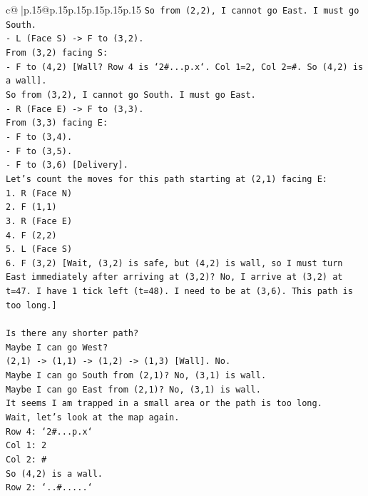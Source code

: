 \documentclass{article}
\begin{document}
{\begin{supertabular}{c@{$\;$}|p{.15\linewidth}@{}p{.15\linewidth}p{.15\linewidth}p{.15\linewidth}p{.15\linewidth}p{.15\linewidth}}
{{{\texttt{So from (2,2), I cannot go East. I must go South.} \\
\texttt{{-} L (Face S) {-}> F to (3,2).} \\
\texttt{From (3,2) facing S:} \\
\texttt{{-} F to (4,2) {[}Wall? Row 4 is `2\#...p.x`. Col 1=2, Col 2=\#. So (4,2) is a wall{]}.} \\
\texttt{So from (3,2), I cannot go South. I must go East.} \\
\texttt{{-} R (Face E) {-}> F to (3,3).} \\
\texttt{From (3,3) facing E:} \\
\texttt{{-} F to (3,4).} \\
\texttt{{-} F to (3,5).} \\
\texttt{{-} F to (3,6) {[}Delivery{]}.} \\
\texttt{Let's count the moves for this path starting at (2,1) facing E:} \\
\texttt{1. R (Face N)} \\
\texttt{2. F (1,1)} \\
\texttt{3. R (Face E)} \\
\texttt{4. F (2,2)} \\
\texttt{5. L (Face S)} \\
\texttt{6. F (3,2) {[}Wait, (3,2) is safe, but (4,2) is wall, so I must turn East immediately after arriving at (3,2)? No, I arrive at (3,2) at t=47. I have 1 tick left (t=48). I need to be at (3,6). This path is too long.{]}} \\
\\ 
\texttt{Is there any shorter path?} \\
\texttt{Maybe I can go West?} \\
\texttt{(2,1) {-}> (1,1) {-}> (1,2) {-}> (1,3) {[}Wall{]}. No.} \\
\texttt{Maybe I can go South from (2,1)? No, (3,1) is wall.} \\
\texttt{Maybe I can go East from (2,1)? No, (3,1) is wall.} \\
\texttt{It seems I am trapped in a small area or the path is too long.} \\
\texttt{Wait, let's look at the map again.} \\
\texttt{Row 4: `2\#...p.x`} \\
\texttt{Col 1: 2} \\
\texttt{Col 2: \#} \\
\texttt{So (4,2) is a wall.} \\
\texttt{Row 2: `..\#.....`} \\
}}}
\end{supertabular}}
\end{document}
